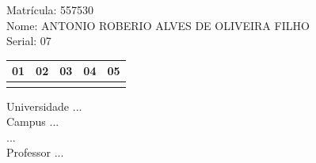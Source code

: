 \documentclass[10pt,a4paper,twocolumn]{report}
\begin{document}
Matrícula: 557530\\ Nome: ANTONIO ROBERIO ALVES DE OLIVEIRA FILHO \\ Serial: 07\\
\begin{tabular}{|l|l|l|l|l|}\hline
01  &02  &03  &04  &05 \\ \hline 
 & & & & \\ \hline 
\end{tabular}
 \cleardoublepage 

\begin{flushleft}
Universidade ...\\
Campus ...\\
...\\
Professor ...\\
\end{flushleft}
\end{document}
